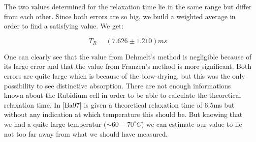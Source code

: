 The two values determined for the relaxation time lie in the same range but differ from each other. Since both errors are so big, we build a weighted average in order to find a satisfying value. We get:

$$\boxed{T_R = (7.626 \pm 1.210) ms}$$

One can clearly see that the value from Dehmelt's method is negligible because of its large error and that the value from Franzen's method is more significant. Both errors are quite large which is because of the blow-drying, but this was the only possibility to see distinctive absorption. There are not enough informations known about the Rubidium cell in order to be able to calculate the theoretical relaxation time. In [Ba97] is given a theoretical relaxation time of 6.5ms but without any indication at which temperature this should be. But knowing that we had a quite large temperatur ($\sim60-70^\circ C$) we can estimate our value to lie not too far away from what we should have measured.













